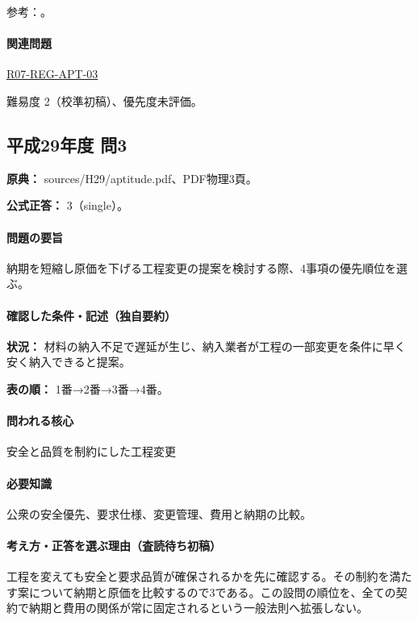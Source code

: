 \par 参考：\cite{davis_seven_steps}。

\paragraph{関連問題} \hyperref[q:r07-reg-apt-03]{R07-REG-APT-03}

\par 難易度 2（校準初稿）、優先度未評価。

\subsection{平成29年度 問3}
\label{q:h29-reg-apt-03}

\noindent\textbf{原典：} sources/H29/aptitude.pdf、PDF物理3頁。

\textbf{公式正答：} 3（single）。

\paragraph{問題の要旨} 納期を短縮し原価を下げる工程変更の提案を検討する際、4事項の優先順位を選ぶ。

\paragraph{確認した条件・記述（独自要約）}\mbox{}\par

\noindent\textbf{状況：} 材料の納入不足で遅延が生じ、納入業者が工程の一部変更を条件に早く安く納入できると提案。\par

\noindent\textbf{表の順：} 1番→2番→3番→4番。\par

\paragraph{問われる核心} 安全と品質を制約にした工程変更

\paragraph{必要知識} 公衆の安全優先、要求仕様、変更管理、費用と納期の比較。

\paragraph{考え方・正答を選ぶ理由（査読待ち初稿）} 工程を変えても安全と要求品質が確保されるかを先に確認する。その制約を満たす案について納期と原価を比較するので3である。この設問の順位を、全ての契約で納期と費用の関係が常に固定されるという一般法則へ拡張しない。

